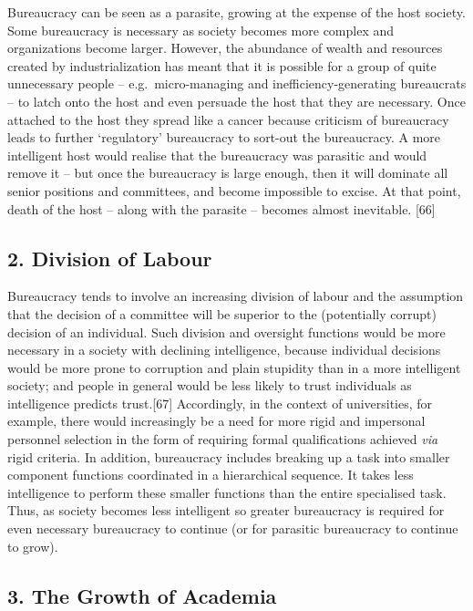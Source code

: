 \documentclass[
]{book}
\begin{document}
Bureaucracy can be seen as a parasite, growing at the expense of the host society. Some bureaucracy is necessary as society becomes more complex and organizations become larger. However, the abundance of wealth and resources created by industrialization has meant that it is possible for a group of quite unnecessary people -- e.g.~micro-managing and inefficiency-generating bureaucrats -- to latch onto the host and even persuade the host that they are necessary. Once attached to the host they spread like a cancer because criticism of bureaucracy leads to further `regulatory' bureaucracy to sort-out the bureaucracy. A more intelligent host would realise that the bureaucracy was parasitic and would remove it -- but once the bureaucracy is large enough, then it will dominate all senior positions and committees, and become impossible to excise. At that point, death of the host -- along with the parasite -- becomes almost inevitable. {[}66{]}

\hypertarget{division-of-labour}{%
\subsection*{2. Division of Labour}\label{division-of-labour}}

Bureaucracy tends to involve an increasing division of labour and the assumption that the decision of a committee will be superior to the (potentially corrupt) decision of an individual. Such division and oversight functions would be more necessary in a society with declining intelligence, because individual decisions would be more prone to corruption and plain stupidity than in a more intelligent society; and people in general would be less likely to trust individuals as intelligence predicts trust.{[}67{]} Accordingly, in the context of universities, for example, there would increasingly be a need for more rigid and impersonal personnel selection in the form of requiring formal qualifications achieved \emph{via} rigid criteria. In addition, bureaucracy includes breaking up a task into smaller component functions coordinated in a hierarchical sequence. It takes less intelligence to perform these smaller functions than the entire specialised task. Thus, as society becomes less intelligent so greater bureaucracy is required for even necessary bureaucracy to continue (or for parasitic bureaucracy to continue to grow).

\hypertarget{the-growth-of-academia}{%
\subsection*{3. The Growth of Academia}\label{the-growth-of-academia}}
\end{document}
